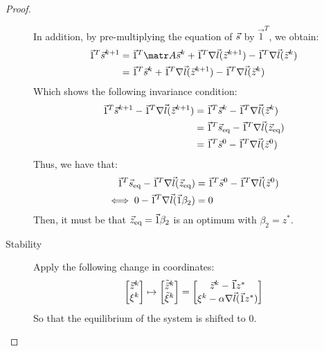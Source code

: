 \begin{subappendices}
\begin{theorem}
\begin{proof}
\begin{description}
                In addition, by pre-multiplying the equation of ${\vec{s}}$ by $\vec{1}^T$, we obtain:
                \[
                    \begin{split}
                        \vec{1}^T \s^{k+1} &= \vec{1}^T \A \s^k + \vec{1}^T \nabla \vec{l}(\z^{k+1}) - \vec{1}^T \nabla \vec{l}(\z^{k}) \\
                        &= \vec{1}^T \s^k + \vec{1}^T \nabla \vec{l}(\z^{k+1}) - \vec{1}^T \nabla \vec{l}(\z^{k}) 
                    \end{split}
                \]
                Which shows the following invariance condition:
                \[ 
                    \begin{aligned}
                        \vec{1}^T {\vec{s}}^{k+1} - \vec{1}^T \nabla \vec{l}({\vec{z}}^{k+1})
                        &= \vec{1}^T {\vec{s}}^k - \vec{1}^T \nabla \vec{l}({\vec{z}}^{k}) \\
                        &= \vec{1}^T {\vec{s}}_\text{eq} - \vec{1}^T \nabla \vec{l}({\vec{z}}_\text{eq}) \\
                        &= \vec{1}^T {\vec{s}}^0 - \vec{1}^T \nabla \vec{l}({\vec{z}}^{0}) \\
                    \end{aligned}
                \]
                Thus, we have that:
                \[
                    \begin{split}
                        \vec{1}^T {\vec{s}}_\text{eq} - \vec{1}^T \nabla \vec{l}({\vec{z}}_\text{eq})
                        &= \vec{1}^T {\vec{s}}^0 - \vec{1}^T \nabla \vec{l}({\vec{z}}^{0}) \\
                        \iff 0 - \vec{1}^T \nabla \vec{l}(\vec{1}\beta_2) &= 0 \\
                    \end{split}
                \]
                Then, it must be that ${\vec{z}}_\text{eq} = \vec{1}\beta_2$ is an optimum with $\beta_2 = z^*$.
        
            \item[Stability]
                Apply the following change in coordinates:
                \[
                    \begin{bmatrix}
                        {\vec{z}}^k \\ \xi^k
                    \end{bmatrix}
                    \mapsto
                    \begin{bmatrix}
                        \tilde{{\vec{z}}}^k \\ \tilde{\xi}^k
                    \end{bmatrix}
                    =
                    \begin{bmatrix}
                        {\vec{z}}^k - \vec{1}z^* \\
                        \xi^k - \alpha \nabla \vec{l}(\vec{1}z^*)
                    \end{bmatrix}
                \]
                So that the equilibrium of the system is shifted to $0$.


\end{description}
\end{proof}
\end{theorem}
\end{subappendices}
